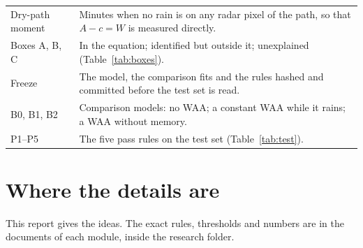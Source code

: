 \documentclass[11pt,a4paper]{article}
\begin{document}
\begin{tabularx}{\linewidth}{@{}l Y@{}}
Dry-path moment & Minutes when no rain is on any radar pixel of the path, so that $A - c = W$ is measured directly. \\
Boxes A, B, C & In the equation; identified but outside it; unexplained (Table~\ref{tab:boxes}). \\
Freeze & The model, the comparison fits and the rules hashed and committed before the test set is read. \\
B0, B1, B2 & Comparison models: no WAA; a constant WAA while it rains; a WAA without memory. \\
P1--P5 & The five pass rules on the test set (Table~\ref{tab:test}). \\
\bottomrule
\end{tabularx}

\clearpage
\section{Where the details are}
\label{app:where}

This report gives the ideas. The exact rules, thresholds and numbers are in the documents of each module, inside the
research folder.
\end{document}
